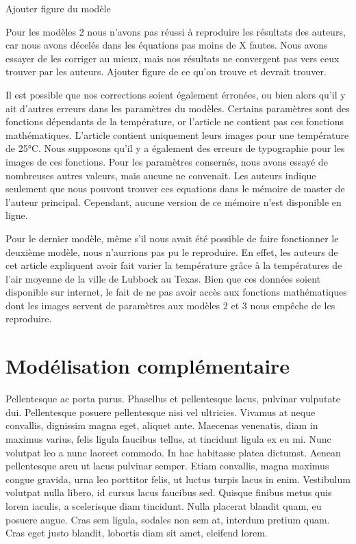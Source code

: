 \documentclass[
  12pt,
  oneside]{article}
\begin{document}
Ajouter figure du modèle

Pour les modèles 2 nous n'avons pas réussi à reproduire les résultats
des auteurs, car nous avons décelés dans les équations pas moins de X
fautes. Nous avons essayer de les corriger au mieux, mais nos résultats
ne convergent pas vers ceux trouver par les auteurs. Ajouter figure de
ce qu'on trouve et devrait trouver.

Il est possible que nos corrections soient également érronées, ou bien
alors qu'il y ait d'autres erreurs dans les paramètres du modèles.
Certains paramètres sont des fonctions dépendants de la température, or
l'article ne contient pas ces fonctions mathématiques. L'article
contient uniquement leurs images pour une température de 25°C. Nous
supposons qu'il y a également des erreurs de typographie pour les images
de ces fonctions. Pour les paramètres consernés, nous avons essayé de
nombreuses autres valeurs, mais aucune ne convenait. Les auteurs indique
seulement que nous pouvont trouver ces equations dans le mémoire de
master de l'auteur principal. Cependant, aucune version de ce mémoire
n'est disponible en ligne.

Pour le dernier modèle, même s'il nous avait été possible de faire
fonctionner le deuxième modèle, nous n'aurrions pas pu le reproduire. En
effet, les auteurs de cet article expliquent avoir fait varier la
température grâce à la températures de l'air moyenne de la ville de
Lubbock au Texas. Bien que ces données soient disponible sur internet,
le fait de ne pas avoir accès aux fonctions mathématiques dont les
images servent de paramètres aux modèles 2 et 3 nous empêche de les
reproduire.

\hypertarget{moduxe9lisation-compluxe9mentaire}{%
\section{Modélisation
complémentaire}\label{moduxe9lisation-compluxe9mentaire}}

Pellentesque ac porta purus. Phasellus et pellentesque lacus, pulvinar
vulputate dui. Pellentesque posuere pellentesque nisi vel ultricies.
Vivamus at neque convallis, dignissim magna eget, aliquet ante. Maecenas
venenatis, diam in maximus varius, felis ligula faucibus tellus, at
tincidunt ligula ex eu mi. Nunc volutpat leo a nunc laoreet commodo. In
hac habitasse platea dictumst. Aenean pellentesque arcu ut lacus
pulvinar semper. Etiam convallis, magna maximus congue gravida, urna leo
porttitor felis, ut luctus turpis lacus in enim. Vestibulum volutpat
nulla libero, id cursus lacus faucibus sed. Quisque finibus metus quis
lorem iaculis, a scelerisque diam tincidunt. Nulla placerat blandit
quam, eu posuere augue. Cras sem ligula, sodales non sem at, interdum
pretium quam. Cras eget justo blandit, lobortis diam sit amet, eleifend
lorem.
\end{document}

